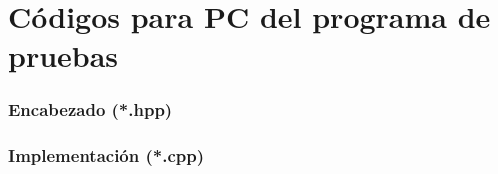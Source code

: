 \chapter{Códigos para PC del programa de pruebas}
	\label{ap:cpp}
	\subsection*{Encabezado (*.hpp)}
			
	\subsection*{Implementación (*.cpp)}
			